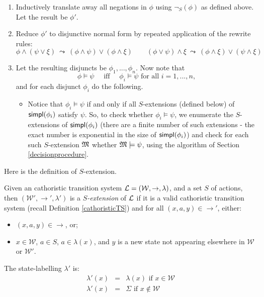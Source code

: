 \begin{enumerate}

\item Inductively translate away all negations in $\phi$ using
  $\neg_S(\phi)$ as defined above.  Let the result be $\phi'$.

\item Reduce $\phi'$ to disjunctive normal form by repeated
  application of the rewrite rules:
  \[
    \phi \land (\psi \lor \xi)  \ \leadsto \ (\phi \land \psi) \lor (\phi \land \xi)  
       \qquad
    (\phi \lor \psi) \land \xi  \ \leadsto \ (\phi \land \xi) \lor (\psi \land \xi) 
  \]

\item Let the resulting disjuncts be $\phi_1, ..., \phi_n$. 
Now note that
\[
\phi \models \psi \quad\text{ iff }\quad \phi_i \models \psi \text{ for all } i = 1, ..., n,
\]
and for each disjunct $\phi_i$ do the following.
\begin{itemize}

\item Notice that $\phi_i \models \psi$ if and only if all
  $S$-extensions (defined below) of $\mathsf{simpl}(\phi_i)$ satisfy $\psi$.
  So, to check whether $\phi_i \models \psi$, we enumerate the
  $S$-extensions of $\mathsf{simpl}(\phi_i)$ (there are a finite number of
  such extensions - the exact number is exponential in the size of
  $\mathsf{simpl}(\phi_i)$) and check for each such $S$-extension $\frak{M}$
  whether $\frak{M}\models \psi$, using the algorithm of Section
  \ref{decisionprocedure}.

\end{itemize}
\end{enumerate}

\NI  Here is the definition of $S$-extension.

\begin{definition}
Given an cathoristic transition system $\mathcal{L} =
(\mathcal{W},\rightarrow,\lambda)$, and a set $S$ of actions, then
$(\mathcal{W'},\rightarrow',\lambda')$ is a \emph{$S$-extension} of
$\mathcal{L}$ if it is a valid cathoristic transition system (recall
Definition \ref{cathoristicTS}) and for all $(x,a,y) \in
\rightarrow'$, either:
\begin{itemize} 

\item $(x, a, y) \in \rightarrow$,  or;

\item $x \in \mathcal{W}$, $a \in S$, $a \in \lambda(x)$, and $y$ is a new state not
  appearing elsewhere in $\mathcal{W}$ or $\mathcal{W'}$.

\end{itemize}
\end{definition}
The state-labelling $\lambda'$ is:
\begin{eqnarray*}
\lambda'(x) & = & \lambda(x) \text{ if } x \in \mathcal{W} \\
\lambda'(x) & = & \Sigma \text{ if } x \notin \mathcal{W} \\
\end{eqnarray*}

